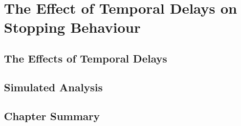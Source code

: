 
\chapter{The Effect of Temporal Delays on Stopping Behaviour}\label{chap:temporal}

\section{The Effects of Temporal Delays}

\section{Simulated Analysis}

\section{Chapter Summary}